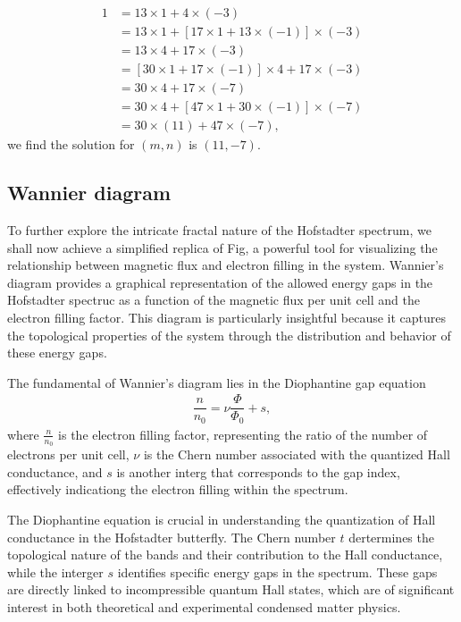 \documentclass{report}
\newcommand{\f}[2]{\dfrac{#1}{#2}}
\begin{document}
\begin{equation}
	\begin{aligned}
		1 & = 13 \times 1 + 4 \times (-3)                              \\
		  & = 13 \times 1 + [17 \times 1 + 13 \times (-1)] \times (-3) \\
		  & = 13 \times 4 +17 \times (-3)                              \\
		  & = [30 \times 1 + 17 \times (-1)] \times 4 + 17 \times (-3) \\
		  & = 30 \times 4 + 17 \times (-7)                             \\
		  & = 30 \times 4 + [47 \times 1 + 30 \times (-1)] \times (-7) \\
		  & = 30 \times (11) + 47 \times (-7),
	\end{aligned}
\end{equation}
we find the solution for $(m,n)$ is $(11,-7)$.
\subsection{Wannier diagram}
To further explore the intricate fractal nature of the Hofstadter spectrum, we shall now achieve a simplified replica of Fig, a powerful tool for visualizing the relationship between magnetic flux and electron filling in the system. Wannier's diagram provides a graphical representation of the allowed energy gaps in the Hofstadter spectruc as a function of the magnetic flux per unit cell and the electron filling factor. This diagram is particularly insightful because it captures the topological properties of the system through the distribution and behavior of these energy gaps.

The fundamental of Wannier's diagram lies in the Diophantine gap equation
\begin{gather}
	\f{n}{n_{0}} = \nu \f{\Phi}{\Phi_{0}} + s,
\end{gather}
where $\frac{n}{n_{0}}$ is the electron filling factor, representing the ratio of the number of electrons per unit cell, $\nu$ is the Chern number associated with the quantized Hall conductance, and $s$ is another interg that corresponds to the gap index, effectively indicationg the electron filling within the spectrum.

The Diophantine equation is crucial in understanding the quantization of Hall conductance in the Hofstadter butterfly. The Chern number $t$ dertermines the topological nature of the bands and their contribution to the Hall conductance, while the interger $s$ identifies specific energy gaps in the spectrum. These gaps are directly linked to incompressible quantum Hall states, which are of significant interest in both theoretical and experimental condensed matter physics.
\end{document}

